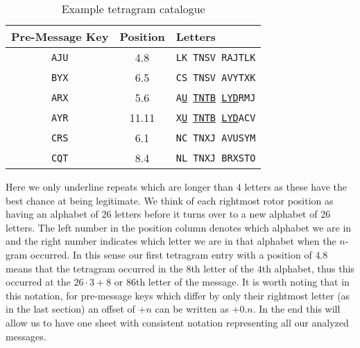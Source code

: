 \begin{table}[h!]
  \centering
  \begin{tabular}{|c|c|l|}
    \hline
    \textbf{Pre-Message Key} & \textbf{Position} & \textbf{Letters}
    \\
    \hline
    \texttt{AJU}             & 4.8               & \texttt{LK TNSV
    RAJTLK}
    \\
    \texttt{BYX}             & 6.5               & \texttt{CS TNSV
    AVYTXK}
    \\
    \texttt{ARX}             & 5.6               &
    \texttt{A}{\uline{\texttt{U}}}\texttt{
    }{\uline{\texttt{T}}}\texttt{}{\uline{\texttt{N}}}\texttt{}{\uline{\texttt{T}}}\texttt{}{\uline{\texttt{B}}}\texttt{
    }{\uline{\texttt{L}}}\texttt{}{\uline{\texttt{Y}}}\texttt{}{\uline{\texttt{D}}}\texttt{RMJ}
    \\
    \texttt{AYR}             & 11.11             &
    \texttt{X}{\uline{\texttt{U}}}\texttt{
    }{\uline{\texttt{T}}}\texttt{}{\uline{\texttt{N}}}\texttt{}{\uline{\texttt{T}}}\texttt{}{\uline{\texttt{B}}}\texttt{
    }{\uline{\texttt{L}}}\texttt{}{\uline{\texttt{Y}}}\texttt{}{\uline{\texttt{D}}}\texttt{ACV}
    \\
    \texttt{CRS}             & 6.1               & \texttt{NC TNXJ
    AVUSYM}
    \\
    \texttt{CQT}             & 8.4               &
    \texttt{}{\texttt{N}}\texttt{L TNXJ BRXSTO}
    \\
    \hline
  \end{tabular}
  \caption{Example tetragram catalogue}
\end{table}
\noindent Here we only underline repeats which are longer than $4$
letters as these have the best chance at being legitimate. We think
of each rightmost rotor position as having an alphabet of 26
letters before it turns over to a new alphabet of 26 letters. The
left number in the position column denotes which alphabet we are in and
the right number indicates which letter we are in that alphabet
when the $n$-gram occurred. In this sense our first tetragram entry
with a position of $4.8$ means that the tetragram occurred in the
$8$th letter of the $4$th alphabet, thus this occurred at the
$26\cdot3 + 8$ or $86$th letter of the message. It is worth noting
that in this notation, for pre-message keys which differ by only
their rightmost letter (as in the last section) an offset of $+n$
can be written as $+0.n$. In the end this will allow us to have one
sheet with consistent notation representing all our analyzed messages.

